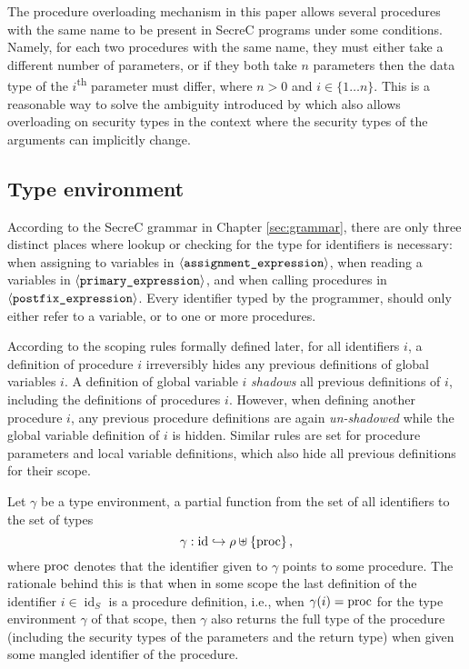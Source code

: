 \documentclass[a4paper, 10pt, draft]{report}
\newcommand{\mycode}[1]{\ensuremath{\mbox{\lstinline{#1}}}}
\newcommand{\bnfNT}[1]{\ensuremath{\mathbf{\left\langle\mbox{\texttt{#1}}\right\rangle}}}
\begin{document}
The procedure overloading mechanism in this paper allows several procedures
with the same name to be present in SecreC programs under some conditions.
Namely, for each two procedures with the same name, they must either take a
different number of parameters, or if they both take $n$ parameters then the
data type of the $i$\textsuperscript{th} parameter must differ, where $n > 0$
and $i\in\{1\ldots n\}$. This is a reasonable way to solve the ambiguity
introduced by \cite{SECREC} which also allows overloading on security types in
the context where the security types of the arguments can implicitly change.

\subsection{Type environment}\label{sec:checking:typing:environment}

According to the SecreC grammar in Chapter \ref{sec:grammar}, there are only
three distinct places where lookup or checking for the type for identifiers is
necessary: when assigning to variables in \bnfNT{assignment\_expression}, when
reading a variables in \bnfNT{primary\_expression}, and when calling
procedures in \bnfNT{postfix\_expression}. Every identifier typed by the
programmer, should only either refer to a variable, or to one or more
procedures.

According to the scoping rules formally defined later, for all identifiers $i$,
a definition of procedure $i$ irreversibly hides any previous definitions of
global variables $i$. A definition of global variable $i$ \textit{shadows} all
previous definitions of $i$, including the definitions of procedures $i$.
However, when defining another procedure $i$, any previous procedure
definitions are again \textit{un-shadowed} while the global variable definition
of $i$ is hidden. Similar rules are set for procedure parameters and local
variable definitions, which also hide all previous definitions for their scope.

Let $\gamma$ be a type environment, a partial function from the set of all
identifiers to the set of types
\[
\gamma: \operatorname{id} \hookrightarrow \rho \uplus \left\{\mycode{proc}\right\},
\]
where \mycode{proc} denotes that the identifier given to $\gamma$ points to
some procedure. The rationale behind this is that when in some scope the last
definition of the identifier $i\in\operatorname{id}_S$ is a procedure
definition, i.e., when $\gamma\!\left(i\right)=\mycode{proc}$ for the type
environment $\gamma$ of that scope, then $\gamma$ also returns the full type of
the procedure (including the security types of the parameters and the return
  type) when given some mangled identifier of the procedure.
\end{document}
